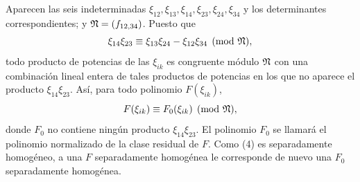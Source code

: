 \documentclass[11pt]{article}
\begin{document}
Aparecen las seis indeterminadas \(\xi_{12},\xi_{13},\xi_{14},\xi_{23},\xi_{24},\xi_{34}\) y los determinantes correspondientes; y \(\mathfrak N=(f_{12,34})\). Puesto que
\begin{equation}
        \xi_{14}\xi_{23}\equiv \xi_{13}\xi_{24}-\xi_{12}\xi_{34}\pmod{\mathfrak N},
\end{equation}
todo producto de potencias de las \(\xi_{ik}\) es congruente módulo \(\mathfrak N\) con una combinación lineal entera de tales productos de potencias en los que no aparece el producto \(\xi_{14}\xi_{23}\). Así, para todo polinomio \(F(\xi_{ik})\),
\begin{equation}
        F(\xi_{ik})\equiv F_0(\xi_{ik})\pmod{\mathfrak N},
\end{equation}
donde \(F_0\) no contiene ningún producto \(\xi_{14}\xi_{23}\). El polinomio \(F_0\) se llamará el polinomio normalizado de la clase residual de \(F\). Como (4) es separadamente homogéneo, a una \(F\) separadamente homogénea le corresponde de nuevo una \(F_0\) separadamente homogénea.
\end{document}
